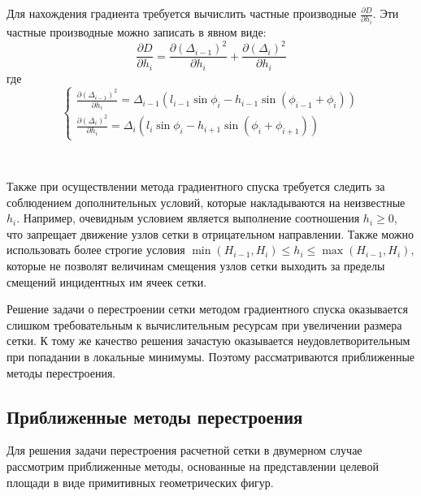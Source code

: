 Для нахождения градиента требуется вычислить частные производные $\frac{\partial D}{\partial h_i}$.
Эти частные производные можно записать в явном виде:
\begin{equation}
\frac{\partial D}{\partial h_i} = \frac{\partial (\Delta_{i - 1})^2}{\partial h_i} + \frac{\partial (\Delta_i)^2}{\partial h_i}
\end{equation}
где
\begin{equation}
\begin{cases}
\frac{\partial (\Delta_{i - 1})^2}{\partial h_i} = \Delta_{i - 1} (l_{i - 1} \sin \phi_i - h_{i - 1} \sin(\phi_{i - 1} + \phi_i)) \\
\frac{\partial (\Delta_i)^2}{\partial h_i} = \Delta_i (l_i \sin \phi_i - h_{i + 1} \sin(\phi_i + \phi_{i+1}))
\end{cases}
\end{equation}

\

Также при осуществлении метода градиентного спуска требуется следить за соблюдением дополнительных условий, которые накладываются на неизвестные $h_i$.
Например, очевидным условием является выполнение соотношения $h_i \ge 0$, что запрещает движение узлов сетки в отрицательном направлении.
Также можно использовать более строгие условия $\min(H_{i - 1}, H_i) \le h_i \le \max(H_{i - 1}, H_i)$, которые не позволят величинам смещения узлов сетки выходить за пределы смещений инцидентных им ячеек сетки.

Решение задачи о перестроении сетки методом градиентного спуска оказывается слишком требовательным к вычислительным ресурсам при увеличении размера сетки.
К тому же качество решения зачастую оказывается неудовлетворительным при попадании в локальные минимумы.
Поэтому рассматриваются приближенные методы перестроения.


\subsection{Приближенные методы перестроения}

Для решения задачи перестроения расчетной сетки в двумерном случае рассмотрим приближенные методы, основанные на представлении целевой площади в виде примитивных геометрических фигур.

